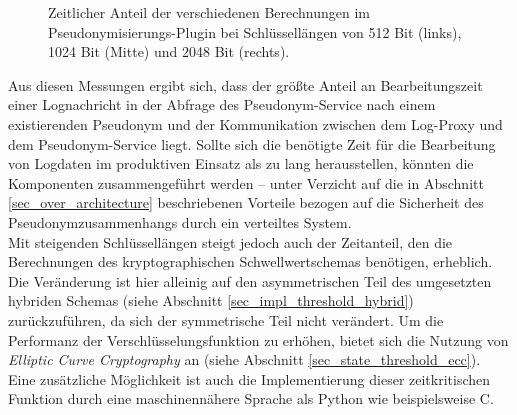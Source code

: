 \begin{figure}[]
    \centering
    \caption{Zeitlicher Anteil der verschiedenen Berechnungen im Pseudonymisierungs-Plugin bei  Schlüssellängen von 512 Bit (links), 1024 Bit (Mitte) und 2048 Bit (rechts).}
    \label{fig:eval_piecharts}
\end{figure}

Aus diesen Messungen ergibt sich, dass der größte Anteil an Bearbeitungszeit einer Lognachricht in der Abfrage des Pseudonym-Service nach einem existierenden Pseudonym und der Kommunikation zwischen dem Log-Proxy und dem Pseudonym-Service liegt. Sollte sich die benötigte Zeit für die Bearbeitung von Logdaten im produktiven Einsatz als zu lang herausstellen, könnten die Komponenten zusammengeführt werden -- unter Verzicht auf die in Abschnitt \ref{sec_over_architecture} beschriebenen Vorteile bezogen auf die Sicherheit des Pseudonymzusammenhangs durch ein verteiltes System.\\
Mit steigenden Schlüssellängen steigt jedoch auch der Zeitanteil, den die Berechnungen des kryptographischen Schwellwertschemas benötigen, erheblich. Die Veränderung ist hier alleinig auf den asymmetrischen Teil des umgesetzten hybriden Schemas (siehe Abschnitt \ref{sec_impl_threshold_hybrid}) zurückzuführen, da sich der symmetrische Teil nicht verändert. Um die Performanz der Verschlüsselungsfunktion zu erhöhen, bietet sich die Nutzung von \textit{Elliptic Curve Cryptography} an (siehe Abschnitt \ref{sec_state_threshold_ecc}). Eine zusätzliche Möglichkeit ist auch die Implementierung dieser zeitkritischen Funktion durch eine maschinennähere Sprache als Python wie beispielsweise C. 

